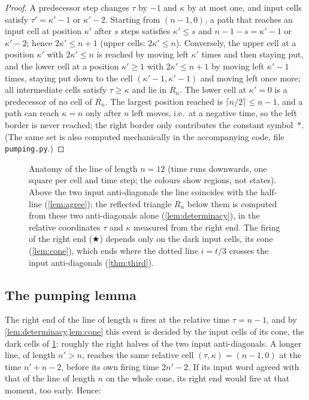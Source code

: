 \begin{proof}
A predecessor step changes $\tau$ by $-1$ and $\kappa$ by at most one, and
input cells satisfy $\tau'=\kappa'-1$ or $\kappa'-2$. Starting from
$(n-1,0)$, a path that reaches an input cell at position $\kappa'$ after $s$
steps satisfies $\kappa'\le s$ and $n-1-s=\kappa'-1$ or $\kappa'-2$; hence
$2\kappa'\le n+1$ (upper cells: $2\kappa'\le n$). Conversely, the upper cell
at a position $\kappa'$ with $2\kappa'\le n$ is reached by moving left
$\kappa'$ times and then staying put, and the lower cell at a position
$\kappa'\ge1$ with $2\kappa'\le n+1$ by moving left $\kappa'-1$ times,
staying put down to the cell $(\kappa'-1,\kappa'-1)$ and moving left once
more; all intermediate cells satisfy $\tau\ge\kappa$ and lie in $R_n$. The
lower cell at $\kappa'=0$ is a predecessor of no cell of $R_n$. The largest
position reached is $\lceil n/2\rceil\le n-1$, and a path can reach
$\kappa=n$ only after $n$ left moves, i.e.\ at a negative time, so the left
border is never reached; the right border only contributes the constant
symbol~$\ast$. (The same set
is also computed mechanically in the accompanying code, file
\texttt{pumping.py}.)
\end{proof}

\begin{figure}[t]
\centering

\caption{Anatomy of the line of length $n=12$ (time runs downwards, one
square per cell and time step; the colours show regions, not states).
Above the two input anti-diagonals the line coincides with the half-line
(\cref{lem:agree}); the reflected triangle $R_n$ below them is computed from
these two anti-diagonals alone (\cref{lem:determinacy}), in the relative
coordinates $\tau$ and $\kappa$ measured from the right end. The firing of
the right end ($\bigstar$) depends only on the dark input cells, its cone
(\cref{lem:cone}), which ends where the dotted line $i=t/3$ crosses the input
anti-diagonals (\cref{thm:third}).}
\label{fig:anatomy}
\end{figure}

\subsection{The pumping lemma}\label{sec:pumplemma}

The right end of the line of length $n$ fires at the relative time
$\tau=n-1$, and by \cref{lem:determinacy,lem:cone} this event is decided by
the input cells of its cone, the dark cells of \cref{fig:anatomy}: roughly
the right halves of the two input anti-diagonals. A longer line, of length
$n'>n$, reaches the same relative cell $(\tau,\kappa)=(n-1,0)$ at the time
$n'+n-2$, before its own firing time $2n'-2$. If its input word agreed with
that of the line of length $n$ on the whole cone, its right end would fire
at that moment, too early. Hence:

